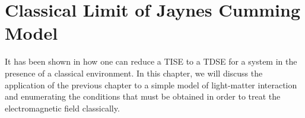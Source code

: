 \chapter[Semi-Classics of Jaynes-Cumming]{Classical Limit of Jaynes Cumming Model\label{chap:braun_briggs_jaynes}}

It has been shown in  how one can reduce a TISE to a TDSE for a system in the presence of a classical environment. In this chapter, we will discuss the application of the previous chapter to a simple model of light-matter interaction and enumerating the conditions that must be obtained in order to treat the electromagnetic field classically. 